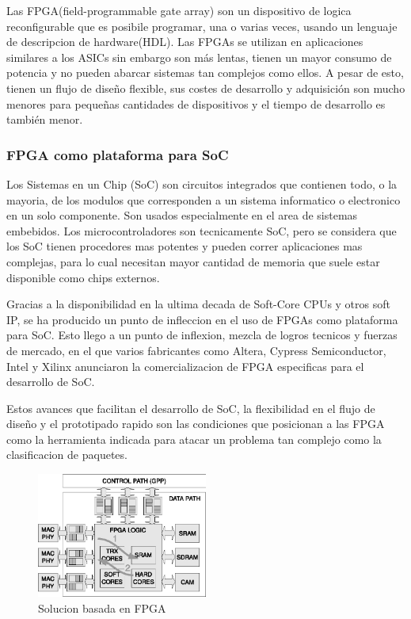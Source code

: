 Las FPGA(field-programmable gate array) son un dispositivo de logica reconfigurable que es posibile programar, una o varias veces, usando un lenguaje de descripcion de hardware(HDL). Las FPGAs se utilizan en aplicaciones similares a los ASICs sin embargo son más lentas, tienen un mayor consumo de potencia y no pueden abarcar sistemas tan complejos como ellos. A pesar de esto, tienen un flujo de diseño flexible, sus costes de desarrollo y adquisición son mucho menores para pequeñas cantidades de dispositivos y el tiempo de desarrollo es también menor.

\subsubsection{FPGA como plataforma para SoC}

Los Sistemas en un Chip (SoC) son circuitos integrados que contienen todo, o la mayoria, de los modulos que corresponden a un sistema informatico o electronico en un solo componente. Son usados especialmente en el area de sistemas embebidos. Los microcontroladores son tecnicamente SoC, pero se considera que los SoC tienen procedores mas potentes y pueden correr aplicaciones mas complejas, para lo cual necesitan mayor cantidad de memoria que suele estar disponible como chips externos. 

Gracias a la disponibilidad en la ultima decada de Soft-Core CPUs y otros soft IP, se ha producido un punto de infleccion en el uso de FPGAs como plataforma para SoC. Esto llego a un punto de inflexion, mezcla de logros tecnicos y fuerzas de mercado, en el que varios fabricantes como Altera, Cypress Semiconductor, Intel y Xilinx anunciaron la comercializacion de FPGA especificas para el desarrollo de SoC.

Estos avances que facilitan el desarrollo de SoC, la flexibilidad en el flujo de diseño y el prototipado rapido son las condiciones que posicionan a las FPGA como la herramienta indicada para atacar un problema tan complejo como la clasificacion de paquetes. 

 \begin{figure}[h]
  \centering
	 \includegraphics[width=0.5\textwidth]{1-introduccion/graf/FPGA_based.eps}
  \caption{Solucion basada en FPGA}
  \label{fig:diseno}
\end{figure}

